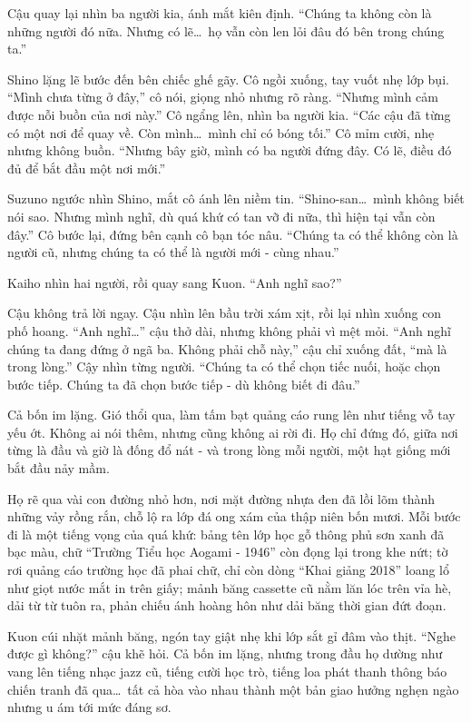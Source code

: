 \documentclass[../main.tex]{subfiles}
\begin{document}
Cậu quay lại nhìn ba người kia, ánh mắt kiên định. ``Chúng ta không còn là những người đó nữa. Nhưng có lẽ\dots\ họ vẫn còn len lỏi đâu đó bên trong chúng ta.''

Shino lặng lẽ bước đến bên chiếc ghế gãy. Cô ngồi xuống, tay vuốt nhẹ lớp bụi. ``Mình chưa từng ở đây,'' cô nói, giọng nhỏ nhưng rõ ràng. ``Nhưng mình cảm được nỗi buồn của nơi này.'' Cô ngẩng lên, nhìn ba người kia. ``Các cậu đã từng có một nơi để quay về. Còn mình\dots\ mình chỉ có bóng tối.'' Cô mỉm cười, nhẹ nhưng không buồn. ``Nhưng bây giờ, mình có ba người đứng đây. Có lẽ, điều đó đủ để bắt đầu một nơi mới.''

Suzuno ngước nhìn Shino, mắt cô ánh lên niềm tin. ``Shino-san\dots\ mình không biết nói sao. Nhưng mình nghĩ, dù quá khứ có tan vỡ đi nữa, thì hiện tại vẫn còn đây.'' Cô bước lại, đứng bên cạnh cô bạn tóc nâu. ``Chúng ta có thể không còn là người cũ, nhưng chúng ta có thể là người mới - cùng nhau.''

Kaiho nhìn hai người, rồi quay sang Kuon. ``Anh nghĩ sao?''

Cậu không trả lời ngay. Cậu nhìn lên bầu trời xám xịt, rồi lại nhìn xuống con phố hoang. ``Anh nghĩ\dots'' cậu thở dài, nhưng không phải vì mệt mỏi. ``Anh nghĩ chúng ta đang đứng ở ngã ba. Không phải chỗ này,'' cậu chỉ xuống đất, ``mà là trong lòng.'' Cậy nhìn từng người. ``Chúng ta có thể chọn tiếc nuối, hoặc chọn bước tiếp. Chúng ta đã chọn bước tiếp - dù không biết đi đâu.''

Cả bốn im lặng. Gió thổi qua, làm tấm bạt quảng cáo rung lên như tiếng vỗ tay yếu ớt. Không ai nói thêm, nhưng cũng không ai rời đi. Họ chỉ đứng đó, giữa nơi từng là đầu và giờ là đống đổ nát - và trong lòng mỗi người, một hạt giống mới bắt đầu nảy mầm.

\ct

Họ rẽ qua vài con đường nhỏ hơn, nơi mặt đường nhựa đen đã lồi lõm thành những vảy rồng rắn, chỗ lộ ra lớp đá ong xám của thập niên bốn mươi. Mỗi bước đi là một tiếng vọng của quá khứ: bảng tên lớp học gỗ thông phủ sơn xanh đã bạc màu, chữ ``Trường Tiểu học Aogami - 1946'' còn đọng lại trong khe nứt; tờ rơi quảng cáo trường học đã phai chữ, chỉ còn dòng ``Khai giảng 2018'' loang lổ như giọt nước mắt in trên giấy; mảnh băng cassette cũ nằm lăn lóc trên vỉa hè, dải từ từ tuôn ra, phản chiếu ánh hoàng hôn như dải băng thời gian đứt đoạn.

Kuon cúi nhặt mảnh băng, ngón tay giật nhẹ khi lớp sắt gỉ đâm vào thịt. ``Nghe được gì không?'' cậu khẽ hỏi. Cả bốn im lặng, nhưng trong đầu họ dường như vang lên tiếng nhạc jazz cũ, tiếng cười học trò, tiếng loa phát thanh thông báo chiến tranh đã qua\dots\ tất cả hòa vào nhau thành một bản giao hưởng nghẹn ngào nhưng u ám tới mức đáng sơ.
\end{document}

